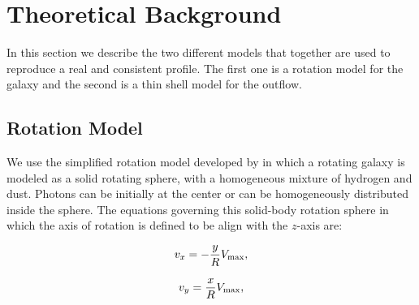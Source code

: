 \documentclass{latex/emulateapj}
\begin{document}



\section{Theoretical Background}
\label{sec:theo}
In this section we describe the two different models that together are used to reproduce a real and consistent \lya profile. The first one is a rotation model for the galaxy and the second is a thin shell model for the outflow. \\ 

\subsection{Rotation Model}

We use the simplified rotation model developed by \citep{Garavito14} in which a rotating galaxy is modeled as a solid rotating sphere, with a homogeneous mixture of hydrogen and dust. Photons can be initially at the center or can be homogeneously distributed inside the sphere. The equations governing this solid-body rotation sphere in
which the axis of rotation is defined to be align with the $z$-axis are: 

\begin{equation}
v_{x}=-\frac{y}{R}V_{\rm max}, \label{subeq1}
\end{equation}

\begin{equation}
v_{y}=\frac{x}{R}V_{\rm max}, \label{subeq2}
\end{equation}
\end{document}
